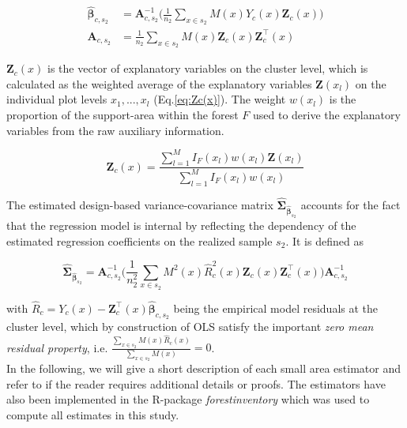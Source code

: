 \begin{subequations}\label{normequ_simple_cluster}
	\begin{align}
	\hat{\pmb{\beta}}_{c,s_2} &= \pmb{A}_{c,s_2}^{-1} \Big(\frac{1}{n_2}\sum_{x\in{s_2}}M(x)Y_{c}(x)\pmb{Z}_{c}(x)\Big) \\
	\pmb{A}_{c,s_2} &=\frac{1}{n_2}\sum_{x\in{s_2}}M(x)\pmb{Z}_{c}(x)\pmb{Z}_{c}^{\top}(x)
	\end{align}
\end{subequations}

\noindent $\pmb{Z}_{c}(x)$ is the vector of explanatory variables on the cluster level, which is calculated as the weighted average of the explanatory variables $\pmb{Z}(x_l)$ on the individual plot levels $x_1, ..., x_l$ (Eq.\ref{eq:Zc(x)}). The weight $w(x_l)$ is the proportion of the support-area within the forest $F$ used to derive the explanatory variables from the raw auxiliary information.

\begin{equation}\label{eq:Zc(x)}
\pmb{Z}_{c}(x)=\frac{\sum_{l=1}^{M}I_{F}(x_l)w(x_l)\pmb{Z}(x_l)}{\sum_{l=1}^{M}I_{F}(x_l)w(x_l)}
\end{equation}

\noindent The estimated design-based variance-covariance matrix $\hat{\pmb{\Sigma}}_{\hat{\pmb{\beta}}_{s_2}}$ accounts for the fact that the regression model is internal by reflecting the dependency of the estimated regression coefficients on the realized sample $s_2$. It is defined as

\begin{equation}\label{eq:varcovarbeta}
\hat{\pmb{\Sigma}}_{\hat{\pmb{\beta}}_{s_2}}=\pmb{A}_{c,s_2}^{-1}
\Big(\frac{1}{n_2^2}\sum_{x\in{s_2}}M^{2}(x)\hat{R}_{c}^2(x)\pmb{Z}_{c}(x)\pmb{Z}_{c}^{\top}(x)\Big)
\pmb{A}_{c,s_2}^{-1}
\end{equation}

\noindent with $\hat{R}_{c}=Y_{c}(x)-\pmb{Z}_{c}^{\top}(x)\hat{\pmb{\beta}}_{c,s_2}$ being the empirical model residuals at the cluster level, which by construction of OLS satisfy the important \textit{zero mean residual property}, i.e. $\frac{\sum_{x \in s_{2}} M(x) \hat{R}_{c}(x)}{\sum_{x \in s_{2}} M(x)}=0$.\\

In the following, we will give a short description of each small area estimator and refer to \citet{mandallaz2013a, mandallaz2016, mandallaz2013b} if the reader requires additional details or proofs. The estimators have also been implemented in the R-package \textit{forestinventory} \citep{forestinventory} which was used to compute all estimates in this study.\\




